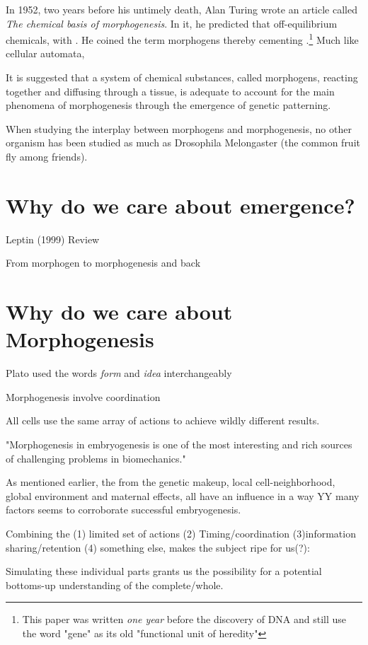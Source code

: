In 1952, two years before his untimely death, Alan Turing wrote an article called
\textit{The chemical basis of morphogenesis}.\cite{turing52the} In it, he predicted that off-equilibrium chemicals, with . He coined the term morphogens thereby cementing .\footnote{This paper was written \textit{one year} before the discovery of DNA and still use the word "gene" as its old "functional unit of heredity"} Much like cellular automata, 



It is suggested that a system of chemical substances, called morphogens, reacting together and diffusing through a tissue, is adequate to account for the main phenomena of morphogenesis through the emergence of genetic patterning.

When studying the interplay between morphogens and morphogenesis, no other organism has been studied as much as Drosophila Melongaster (the common fruit fly among friends).



\section{Why do we care about emergence?}
Leptin (1999) Review

From morphogen to morphogenesis and back
\section{Why do we care about Morphogenesis}
Plato used the words \textit{form} and \textit{idea} interchangeably

Morphogenesis involve coordination

All cells use the same array of actions to achieve wildly different results.  

"Morphogenesis in embryogenesis is one of the most interesting and rich sources of challenging problems in biomechanics."

As mentioned earlier, the  from the genetic makeup, local cell-neighborhood, global environment and maternal effects, all have an influence in a way YY many factors seems to corroborate successful embryogenesis. 

Combining the (1) limited set of actions (2) Timing/coordination (3)information sharing/retention (4) something else, makes the subject ripe for us(?):

Simulating these individual parts grants us the possibility for a potential bottoms-up understanding of the complete/whole.


